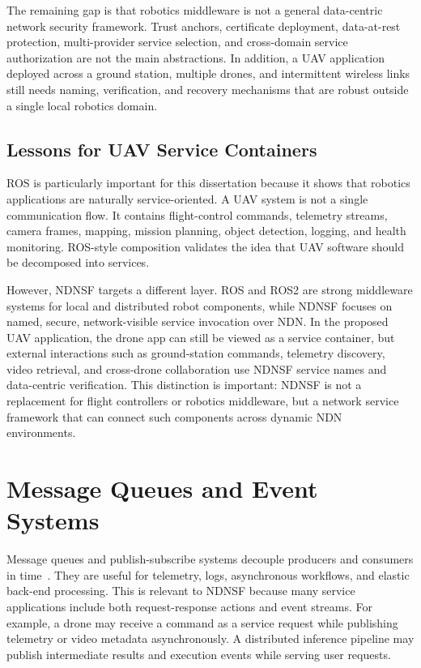 The remaining gap is that robotics middleware is not a general data-centric
network security framework. Trust anchors, certificate deployment, data-at-rest
protection, multi-provider service selection, and cross-domain service
authorization are not the main abstractions. In addition, a UAV application
deployed across a ground station, multiple drones, and intermittent wireless
links still needs naming, verification, and recovery mechanisms that are robust
outside a single local robotics domain.

\subsection{Lessons for UAV Service Containers}

ROS is particularly important for this dissertation because it shows that
robotics applications are naturally service-oriented. A UAV system is not a
single communication flow. It contains flight-control commands, telemetry
streams, camera frames, mapping, mission planning, object detection, logging,
and health monitoring. ROS-style composition validates the idea that UAV
software should be decomposed into services.

However, NDNSF targets a different layer. ROS and ROS2 are strong middleware
systems for local and distributed robot components, while NDNSF focuses on
named, secure, network-visible service invocation over NDN. In the proposed
UAV application, the drone app can still be viewed as a service container, but
external interactions such as ground-station commands, telemetry discovery,
video retrieval, and cross-drone collaboration use NDNSF service names and
data-centric verification. This distinction is important: NDNSF is not a
replacement for flight controllers or robotics middleware, but a network
service framework that can connect such components across dynamic NDN
environments.

\section{Message Queues and Event Systems}

Message queues and publish-subscribe systems decouple producers and consumers
in time~\cite{messagequeue}. They are useful for telemetry, logs,
asynchronous workflows, and elastic back-end processing. This is relevant to
NDNSF because many service applications include both request-response actions
and event streams. For example, a drone may receive a command as a service
request while publishing telemetry or video metadata asynchronously. A
distributed inference pipeline may publish intermediate results and execution
events while serving user requests.

